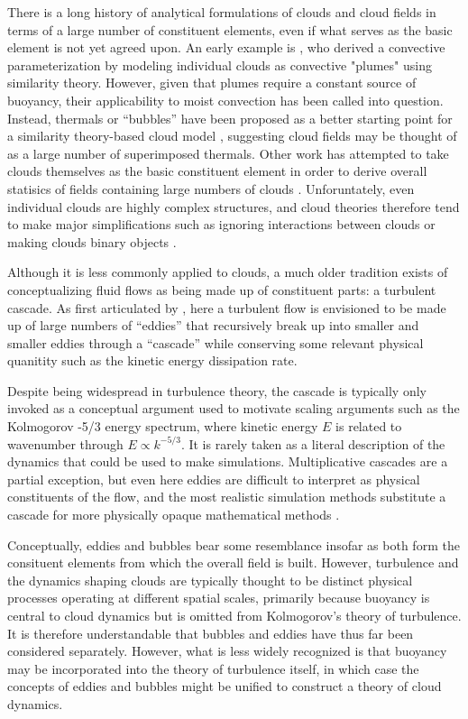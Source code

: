 \documentclass[acp, manuscript, english]{copernicus}
\begin{document}
There is a long history of analytical formulations of clouds and cloud fields in terms of a large number of constituent elements, even if what serves as the basic element is not yet agreed upon. An early example is \cite{arakawa1974}, who derived a convective parameterization by modeling individual clouds as convective "plumes" using similarity theory. However, given that plumes require a constant source of buoyancy, their applicability to moist convection has been called into question. Instead, thermals or ``bubbles'' have been proposed as a better starting point for a similarity theory-based cloud model \citep{yano2016}, suggesting cloud fields may be thought of as a large number of superimposed thermals.
Other work has attempted to take clouds themselves as the basic constituent element in order to derive overall statisics of fields containing large numbers of clouds \citep{craig2006, cohen2006, garrett2018}. Unforuntately, even individual clouds are highly complex structures, and cloud theories therefore tend to make major simplifications such as ignoring interactions between clouds \citep{craig2006} or making clouds binary objects \citep{garrett2018}. 

Although it is less commonly applied to clouds, a much older tradition exists of conceptualizing fluid flows as being made up of constituent parts: a turbulent cascade. As first articulated by \citet{richardson1922}, here a turbulent flow is envisioned to be made up of large numbers of ``eddies'' that recursively break up into smaller and smaller eddies through a ``cascade'' while conserving some relevant physical quanitity such as the kinetic energy dissipation rate. 

Despite being widespread in turbulence theory, the cascade is typically only invoked as a conceptual argument used to motivate scaling arguments such as the Kolmogorov -5/3 energy spectrum, where kinetic energy $E$ is related to wavenumber through $E\propto k^{-5/3}$. It is rarely taken as a literal description of the dynamics that could be used to make simulations. Multiplicative cascades are a partial exception, but even here eddies are difficult to interpret as physical constituents of the flow, and the most realistic simulation methods substitute a cascade for more physically opaque mathematical methods \citep{lovejoy1990,lovejoy2010FIF}.

Conceptually, eddies and bubbles bear some resemblance insofar as both form the consituent elements from which the overall field is built. However, turbulence and the dynamics shaping clouds are typically thought to be distinct physical processes operating at different spatial scales, primarily because buoyancy is central to cloud dynamics but is omitted from Kolmogorov's theory of turbulence. It is therefore understandable that bubbles and eddies have thus far been considered separately. However, what is less widely recognized is that buoyancy may be incorporated into the theory of turbulence itself, in which case the concepts of eddies and bubbles might be unified to construct a theory of cloud dynamics. 
\end{document}
